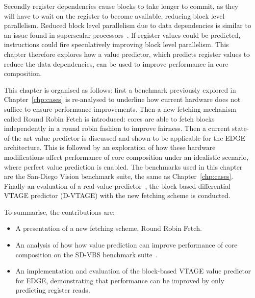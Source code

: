 Secondly register dependencies cause blocks to take longer to commit, as they will have to wait on the register to become available, reducing block level parallelism.
Reduced block level parallelism due to data dependencies is similar to an issue found in superscalar processors~\cite{peraisBeBop2015}.
If register values could be predicted, instructions could fire speculatively improving block level parallelism.
This chapter therefore explores how a value predictor, which predicts register values to reduce the data dependencies, can be used to improve performance in core composition.

This chapter is organised as follows: first a benchmark previously explored in Chapter~\ref{chp:cases} is re-analysed to underline how current hardware does not suffice to ensure performance improvements.
Then a new fetching mechanism called Round Robin Fetch is introduced: cores are able to fetch blocks independently in a round robin fashion to improve fairness.
Then a current state-of-the art value predictor is discussed and shown to be applicable for the EDGE architecture.
This is followed by an exploration of how these hardware modifications affect performance of core composition under an idealistic scenario, where perfect value prediction is enabled.
The benchmarks used in this chapter are the San-Diego Vision benchmark suite, the same as Chapter~\ref{chp:cases}.
Finally an evaluation of a real value predictor~\cite{peraisBeBop2015}, the block based differential VTAGE predictor (D-VTAGE) with the new fetching scheme is conducted.

To summarise, the contributions are:

\begin{itemize}
\item A presentation of a new fetching scheme, Round Robin Fetch.
\vspace{-1em}
\item An analysis of how how value prediction can improve performance of core composition on the SD-VBS benchmark suite~\cite{sdvbs}.
\vspace{-1em}
\item An implementation and evaluation of the block-based VTAGE value predictor for EDGE, demonstrating that performance can be improved by only predicting register reads.
\end{itemize}